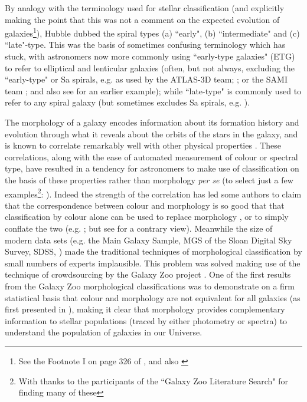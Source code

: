 \documentclass[usenatbib]{mn2e}
\begin{document}
By analogy with the terminology used for stellar classification (and explicitly making the point that this was not a comment on the expected evolution of galaxies\footnote{See the Footnote I on page 326 of \citet{Hubble1926}, and also \citet{Baldry2008AG}}), Hubble dubbed the spiral types (a) ``early",  (b) ``intermediate" and (c) ``late"-type. This was the basis of sometimes confusing terminology which has stuck, with astronomers now more commonly using ``early-type galaxies"  (ETG) to refer to elliptical and lenticular galaxies (often, but not always, excluding the ``early-type" or Sa spirals, e.g. as used by the ATLAS-3D team; \citealt{2011MNRAS.413..813C,2011MNRAS.416.1680C}; or the SAMI team \citealt{2018arXiv180711547F}; and also see \citealt{Stanford1998} for an earlier example); while ``late-type" is commonly used to refer to any spiral galaxy (but sometimes excludes Sa spirals, e.g. \citealt{Strateva2001}).

The morphology of a galaxy encodes information about its formation history and evolution through what it reveals about the orbits of the stars in the galaxy, and is known to correlate remarkably well with other physical properties \citep[e.g. star formation rate, gas content, stellar mass][]{RobertsHaynes1994, Kennicutt1998, Strateva2001}. These correlations, along with the ease of automated measurement of colour or spectral type, have resulted in a tendency for astronomers to make use of classification on the basis of these properties rather than morphology {\it per se} (to select just a few examples\footnote{With thanks to the participants of the ``Galaxy Zoo Literature Search" for finding many of these}: \citealt{Bell2004, Weinmann2006, vandenBosch2008, Cooper2010, Zehavi2011}). Indeed the strength of the correlation has led some authors to claim that the correspondence between colour and morphology is so good that that classification by colour alone can be used to replace morphology \citep[e.g.][]{ParkChoi2005, Faber2007, AscasibarAlmeida2011}, or to simply conflate the two (e.g. \citealt{TalvanDokkum2011}; but see \citealt{vandenBergh2007} for a contrary view). Meanwhile the size of modern data sets (e.g. the Main Galaxy Sample, MGS of the Sloan Digital Sky Survey, SDSS, \citealt{Strauss2002}) made the traditional techniques of morphological classification by small numbers of experts implausible. This problem was solved making use of the technique of crowdsourcing by the Galaxy Zoo project \citep{Lintott2008,Lintott2011}. One of the first results from the Galaxy Zoo morphological classifications was to demonstrate on a firm statistical basis that colour and morphology are not equivalent for all galaxies (as first presented in \citealt{Bamford2009, Schawinski2009,Masters2010}), making it clear that morphology provides complementary information to stellar populations (traced by either photometry or spectra) to understand the population of galaxies in our Universe.   
\end{document}
